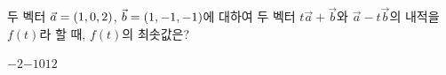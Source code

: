 두 벡터 $\vec{a}=(1{,}\mkern3mu\mathopen{}0{,}\mkern3mu\mathopen{}2)$, $\vec{b}=(1{,}\mkern3mu\mathopen{}-1{,}\mkern3mu\mathopen{}-1)$에 대하여 두 벡터 $t\vec{a}+\vec{b}$와 $\vec{a}-t\vec{b}$의 내적을 $f(t)$라 할 때, $f(t)$의 최솟값은? 
\begin{choices32}{$-2$}{$-1$}{$0$}{$1$}{$2$}\end{choices32}
